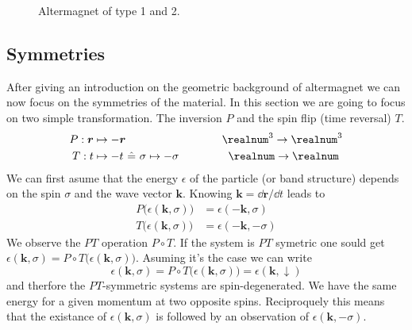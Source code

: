 \documentclass[../main.tex]{main.tex}
\begin{document}
\begin{figure}[H]
    \label{fig:altermagnet}
    \caption{Altermagnet of type 1 and 2.}
\end{figure}    

\subsection{Symmetries}
After giving an introduction on the geometric background of altermagnet we can now focus on the symmetries of the material. In this section
we are going to focus on two simple transformation. The inversion $P$ and the spin flip (time reversal) $T$.
\begin{alignat*}{2}
    P : \bm{r} &\mapsto -\bm{r} ~~~~~~~~~~~~~~~~~~~~ &~~~\realnum^3 \rightarrow \realnum^3 \\
    T : t &\mapsto -t  ~\hat{=} ~\sigma \mapsto -\sigma &\realnum \rightarrow \realnum~
\end{alignat*}
We can first asume that the energy $\epsilon$ of the particle (or band structure) depends on the spin $\sigma$ and the wave vector $\bm{k}$. Knowing 
$\bm{k} = \dd \bm{r}/\dd t$ leads to 
\begin{align*}
    P \bigl(\epsilon(\bm{k}, \sigma)\bigr) &= \epsilon(-\bm{k}, \sigma)\\
    T \bigl(\epsilon(\bm{k}, \sigma)\bigr) &= \epsilon(-\bm{k}, -\sigma)
\end{align*}
We observe the $PT$ operation $P\circ T$. If the system is $PT$ symetric one sould get $\epsilon(\bm{k}, \sigma)= P\circ T\bigl(\epsilon(\bm{k}, \sigma)\bigr)$.
Asuming it's the case we can write
\[
    \epsilon(\bm{k}, \sigma)= P\circ T\bigl(\epsilon(\bm{k}, \sigma)\bigr) =  \epsilon(\bm{k}, \downarrow)
\] 
and therfore the $PT$-symmetric systems are spin-degenerated. We have the same energy for a given momentum at two opposite spins.
 Reciproquely this means that the existance 
of $ \epsilon(\bm{k}, \sigma)$ is followed by an observation of $ \epsilon(\bm{k}, -\sigma)$.\\
\end{document}
